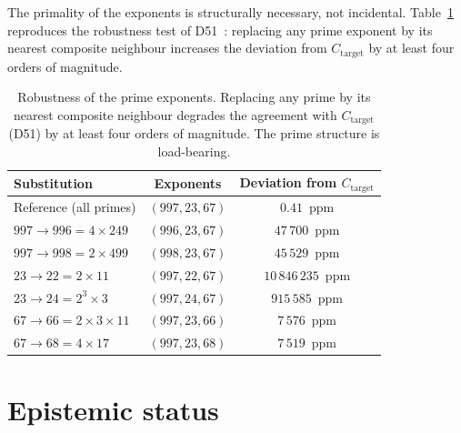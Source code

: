 \documentclass[12pt,a4paper]{article}
\theoremstyle{plain}
\theoremstyle{definition}
\theoremstyle{remark}
\begin{document}
The primality of the exponents is structurally necessary, not incidental. Table~\ref{tab:primes} reproduces the robustness test of D51~\cite{PDL_D51_2026}: replacing any prime exponent by its nearest composite neighbour increases the deviation from $C_{\mathrm{target}}$ by at least four orders of magnitude.

\begin{table}[H]
\centering
\caption{Robustness of the prime exponents. Replacing any prime by its nearest composite neighbour degrades the agreement with $C_{\mathrm{target}}$ (D51) by at least four orders of magnitude. The prime structure is load-bearing.}
\label{tab:primes}
\renewcommand{\arraystretch}{1.3}
\begin{tabular}{lcc}
\toprule
Substitution & Exponents & Deviation from $C_{\mathrm{target}}$ \\
\midrule
Reference (all primes) & $(997, 23, 67)$ & $0.41$~ppm \\
$997 \to 996 = 4 \times 249$ & $(996, 23, 67)$ & $47\,700$~ppm \\
$997 \to 998 = 2 \times 499$ & $(998, 23, 67)$ & $45\,529$~ppm \\
$23 \to 22 = 2 \times 11$ & $(997, 22, 67)$ & $10\,846\,235$~ppm \\
$23 \to 24 = 2^3 \times 3$ & $(997, 24, 67)$ & $915\,585$~ppm \\
$67 \to 66 = 2 \times 3 \times 11$ & $(997, 23, 66)$ & $7\,576$~ppm \\
$67 \to 68 = 4 \times 17$ & $(997, 23, 68)$ & $7\,519$~ppm \\
\bottomrule
\end{tabular}
\end{table}

\section{Epistemic status}
\label{sec:epistemic}
\end{document}
